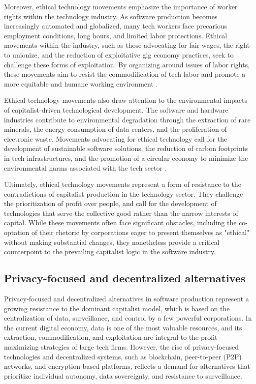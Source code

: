 \begin{refsection}
Moreover, ethical technology movements emphasize the importance of worker rights within the technology industry. As software production becomes increasingly automated and globalized, many tech workers face precarious employment conditions, long hours, and limited labor protections. Ethical movements within the industry, such as those advocating for fair wages, the right to unionize, and the reduction of exploitative gig economy practices, seek to challenge these forms of exploitation. By organizing around issues of labor rights, these movements aim to resist the commodification of tech labor and promote a more equitable and humane working environment \cite[pp.~67-69]{scholz2016}.

Ethical technology movements also draw attention to the environmental impacts of capitalist-driven technological development. The software and hardware industries contribute to environmental degradation through the extraction of rare minerals, the energy consumption of data centers, and the proliferation of electronic waste. Movements advocating for ethical technology call for the development of sustainable software solutions, the reduction of carbon footprints in tech infrastructures, and the promotion of a circular economy to minimize the environmental harms associated with the tech sector \cite[pp.~121-124]{maxwell2014}.

Ultimately, ethical technology movements represent a form of resistance to the contradictions of capitalist production in the technology sector. They challenge the prioritization of profit over people, and call for the development of technologies that serve the collective good rather than the narrow interests of capital. While these movements often face significant obstacles, including the co-optation of their rhetoric by corporations eager to present themselves as "ethical" without making substantial changes, they nonetheless provide a critical counterpoint to the prevailing capitalist logic in the software industry.

\subsection{Privacy-focused and decentralized alternatives}

Privacy-focused and decentralized alternatives in software production represent a growing resistance to the dominant capitalist model, which is based on the centralization of data, surveillance, and control by a few powerful corporations. In the current digital economy, data is one of the most valuable resources, and its extraction, commodification, and exploitation are integral to the profit-maximizing strategies of large tech firms. However, the rise of privacy-focused technologies and decentralized systems, such as blockchain, peer-to-peer (P2P) networks, and encryption-based platforms, reflects a demand for alternatives that prioritize individual autonomy, data sovereignty, and resistance to surveillance.


\end{refsection}
